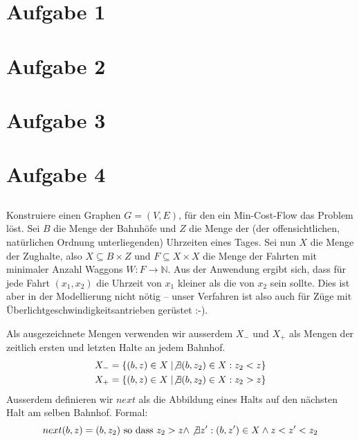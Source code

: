 \documentclass[a4paper]{article}
\begin{document}
\section{Aufgabe 1}

\section{Aufgabe 2}

\section{Aufgabe 3}

\section{Aufgabe 4}

\subsection*{}
Konstruiere einen Graphen $G = (V, E)$, für den ein Min-Cost-Flow das
Problem löst. Sei $B$ die Menge der Bahnhöfe und $Z$ die Menge der (der
offensichtlichen, natürlichen Ordnung unterliegenden) Uhrzeiten
eines Tages. Sei nun $X$ die Menge der Zughalte, also
$X \subseteq B \times Z$ und $F \subseteq X \times X$ die Menge der Fahrten
mit minimaler Anzahl Waggons $W: F \rightarrow \mathbb{N}$. Aus der
Anwendung ergibt sich, dass für jede Fahrt $(x_1, x_2)$ die Uhrzeit von
$x_1$ kleiner als die von $x_2$ sein sollte. Dies ist aber in der
Modellierung nicht nötig -- unser Verfahren ist also auch für Züge mit
Überlichtgeschwindigkeitsantrieben gerüstet :-).

Als ausgezeichnete Mengen verwenden wir ausserdem $X_-$ und $X_+$ als Mengen
der zeitlich ersten und letzten Halte an jedem Bahnhof.
\begin{align*}
X_- &= \{ (b, z) \in X \mid \not\exists (b, z_2) \in X: z_2 < z \} \\
X_+ &= \{ (b, z) \in X \mid \not\exists (b, z_2) \in X: z_2 > z \} \\
\end{align*}
Ausserdem definieren wir $next$ als die Abbildung eines Halts auf den
nächsten Halt am selben Bahnhof. Formal:
\[
	next(b, z) = (b, z_2) \text{ so dass } z_2 > z 
		\wedge \not\exists z': (b, z') \in X \wedge z < z' < z_2
\] 
\end{document}

